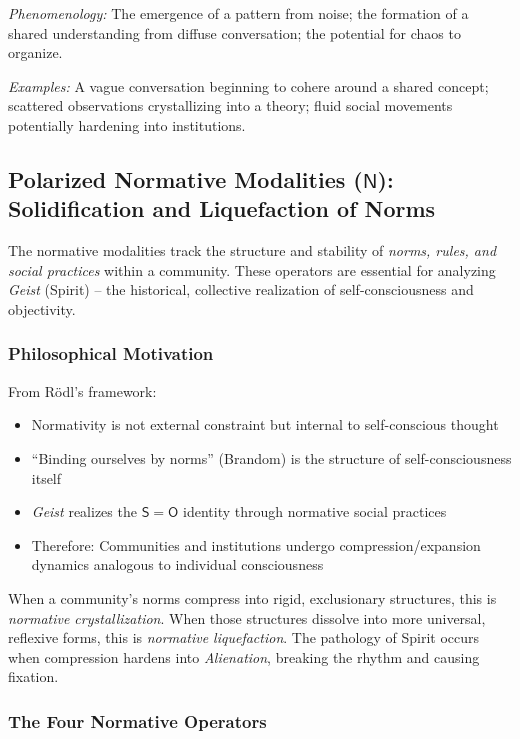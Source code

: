 \documentclass[12pt]{book}
\begin{document}
\textit{Phenomenology:} The emergence of a pattern from noise; the formation of a shared understanding from diffuse conversation; the potential for chaos to organize.

\textit{Examples:} A vague conversation beginning to cohere around a shared concept; scattered observations crystallizing into a theory; fluid social movements potentially hardening into institutions.

\subsection{Polarized Normative Modalities ($\mathsf{N}$): Solidification and Liquefaction of Norms}

The normative modalities track the structure and stability of \textit{norms, rules, and social practices} within a community. These operators are essential for analyzing \textit{Geist} (Spirit) -- the historical, collective realization of self-consciousness and objectivity.

\subsubsection{Philosophical Motivation}

From Rödl's framework:
\begin{itemize}
\item Normativity is not external constraint but internal to self-conscious thought
\item ``Binding ourselves by norms'' (Brandom) is the structure of self-consciousness itself
\item \textit{Geist} realizes the $\mathsf{S} = \mathsf{O}$ identity through normative social practices
\item Therefore: Communities and institutions undergo compression/expansion dynamics analogous to individual consciousness
\end{itemize}

When a community's norms compress into rigid, exclusionary structures, this is \textit{normative crystallization}. When those structures dissolve into more universal, reflexive forms, this is \textit{normative liquefaction}. The pathology of Spirit occurs when compression hardens into \textit{Alienation}, breaking the rhythm and causing fixation.

\subsubsection{The Four Normative Operators}
\end{document}
